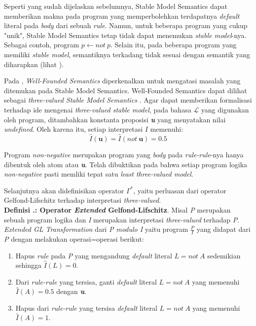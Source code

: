 \noindent Seperti yang sudah dijelaskan sebelumnya, Stable Model Semantics dapat memberikan makna pada program yang memperbolehkan terdapatnya \textit{default} literal pada \textit{body} dari sebuah \textit{rule}. Namun, untuk beberapa program yang cukup "unik", Stable Model Semantics tetap tidak dapat menemukan \textit{stable model}-nya. Sebagai contoh, program $p \leftarrow not \ p$. Selain itu, pada beberapa program yang memiliki \textit{stable model}, semantiknya terkadang tidak sesuai dengan semantik yang diharapkan (lihat \citep{alferes1996reasoning}).

Pada \citep{van1991well}, \textit{Well-Founded Semantics} diperkenalkan untuk mengatasi masalah yang ditemukan pada Stable Model Semantics. Well-Founded Semantics dapat dilihat sebagai \textit{three-valued Stable Model Semantics} \cite{przymusinska1990semantic}. Agar dapat memberikan formalisasi terhadap ide mengenai \textit{three-valued stable model}, pada bahasa $\mathcal{L}$ yang digunakan oleh program, ditambahkan konstanta proposisi \textit{\textbf{u}} yang menyatakan nilai \textit{undefined}. Oleh karena itu, setiap interpretasi $I$ memenuhi:
\begin{displaymath}
\hat{I}(\mathbf{u}) = \hat{I}(not \ \mathbf{u}) = 0.5
\end{displaymath}

Program \textit{non-negative} merupakan program yang \textit{body} pada \textit{rule-rule}-nya hanya dibentuk oleh atom atau \textit{\textbf{u}}. Telah dibuktikan pada \citep{przymusinska1990semantic} bahwa setiap program logika \textit{non-negative} pasti memliki tepat satu \textit{least three-valued model}.

Selanjutnya akan didefinisikan operator $\Gamma^*$, yaitu perluasan dari operator Gelfond-Lifschitz terhadap interpretasi \textit{three-valued}.
\\

\noindent \textbf{Definisi \thebabDuaNum.\thedefBabDua: Operator \textit{Extended} Gelfond-Lifschitz}. Misal \textit{P} merupakan sebuah program logika dan \textit{I} merupakan interpretasi \textit{three-valued} terhadap \textit{P}. \textit{Extended GL Transformation} dari \textit{P modulo I} yaitu program $\frac{P}{I}$ yang didapat dari \textit{P} dengan melakukan operasi=operasi berikut:
\begin{enumerate}
	\item Hapus \textit{rule} pada \textit{P} yang mengandung \textit{default} literal $L = not \ A$ sedemikian sehingga $\hat{I}(L) = 0$.
	\item Dari \textit{rule-rule} yang tersisa, ganti \textit{default} literal $L = not \ A$ yang memenuhi $\hat{I}(A) = 0.5$ dengan \textit{\textbf{u}}.
	\item Hapus dari \textit{rule-rule} yang tersisa \textit{default} literal $L = not \ A$ yang memenuhi $\hat{I}(A) = 1$.
\end{enumerate}

